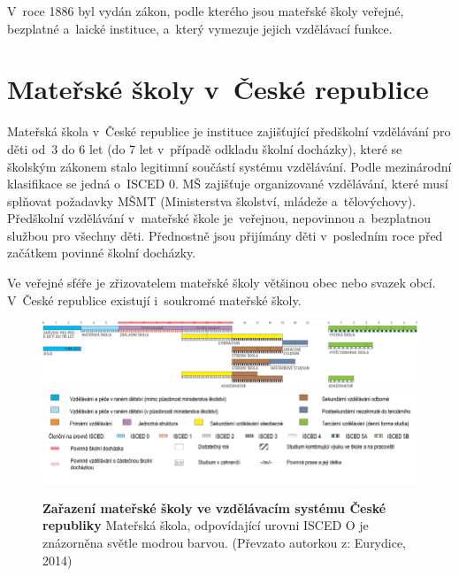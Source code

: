 		V roce 1886 byl vydán zákon, podle kterého jsou mateřské školy veřejné, bezplatné a laické instituce, a~který vymezuje jejich vzdělávací funkce.

	\section{Mateřské školy v~České republice}


		Mateřská škola v České republice je instituce zajišťující předškolní vzdělávání pro děti od 3 do 6 let (do 7 let v případě odkladu školní docházky), které se školským zákonem stalo legitimní součástí systému vzdělávání. Podle mezinárodní klasifikace se jedná o ISCED 0. MŠ zajišťuje organizované vzdělávání, které musí splňovat požadavky MŠMT (Ministerstva školství, mládeže a~tělovýchovy). Předškolní vzdělávání v~mateřské škole je veřejnou, nepovinnou a~bezplatnou službou pro všechny děti. Přednostně jsou přijímány děti v posledním roce před začátkem povinné školní docházky. 
		
		\noindent
		Ve veřejné sféře je zřizovatelem mateřské školy většinou obec nebo svazek obcí. V České republice existují i~soukromé mateřské školy.
		
		\begin{figure} [t]
			\center
			\includegraphics[width=1.0\linewidth]{fotky/msCR.png} \\
			\includegraphics[width=1.0\linewidth]{fotky/msVysvetlivky.png}
			\caption{ \textbf{Zařazení mateřské školy ve vzdělávacím systému České republiky} Mateřská škola, odpovídající urovni ISCED O je znázorněna světle modrou barvou.
			(Převzato autorkou z: Eurydice, 2014)
			}
			\label{obr:msCR}
		\end{figure}

